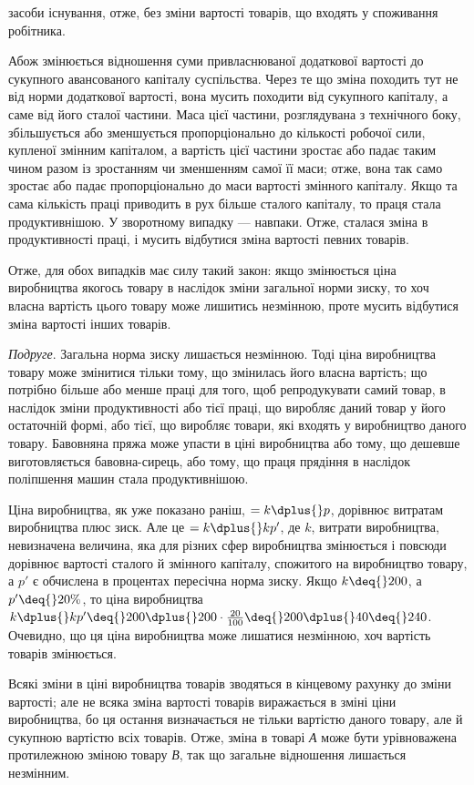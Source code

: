 \parcont{}  %
засоби існування, отже, без зміни вартості товарів, що входять у споживання робітника.

Абож змінюється відношення суми привласнюваної додаткової вартості до сукупного авансованого
капіталу суспільства. Через те що зміна походить тут не від норми додаткової вартості, вона мусить
походити від сукупного капіталу, а саме від його сталої частини. Маса цієї частини, розглядувана з
технічного боку, збільшується або зменшується пропорціонально до кількості робочої сили, купленої
змінним капіталом, а вартість цієї частини зростає або падає таким чином разом із зростанням чи
зменшенням самої її маси; отже, вона так само зростає або падає пропорціонально до маси вартості
змінного капіталу. Якщо та сама кількість праці приводить в рух більше сталого капіталу, то праця
стала продуктивнішою. У зворотному випадку — навпаки. Отже, сталася зміна в продуктивності праці, і
мусить відбутися зміна вартості певних товарів.

Отже, для обох випадків має силу такий закон: якщо змінюється ціна виробництва якогось товару в
наслідок зміни загальної норми зиску, то хоч власна вартість цього товару може лишитись незмінною,
проте мусить відбутися зміна вартості інших товарів.

\emph{Подруге}. Загальна норма зиску лишається незмінною. Тоді ціна виробництва товару може змінитися
тільки тому, що змінилась його власна вартість; що потрібно більше або менше праці для того, щоб
репродукувати самий товар, в наслідок зміни продуктивності або тієї праці, що виробляє даний товар у
його остаточній формі, або тієї, що виробляє товари, які входять у виробництво даного товару.
Бавовняна пряжа може упасти в ціні виробництва або тому, що дешевше виготовляється бавовна-сирець,
або тому, що праця прядіння в наслідок поліпшення машин стала продуктивнішою.

Ціна виробництва, як уже показано раніш, $= k \dplus{} p$, дорівнює витратам виробництва плюс зиск. Але це
$= k \dplus{} kp'$, де $k$, витрати виробництва, невизначена величина, яка для різних сфер виробництва змінюється
і повсюди дорівнює вартості сталого й змінного капіталу, спожитого на виробництво товару, а $p'$ є
обчислена в процентах пересічна норма зиску. Якщо $k \deq{} 200$, а $p' \deq{} 20\%$, то ціна виробництва $k \dplus{} kp' \deq{}
200 \dplus{} 200\cdot\frac{20}{100} \deq{} 200
\dplus{} 40 \deq{} 240$. Очевидно, що ця ціна виробництва може лишатися незмінною, хоч вартість товарів
змінюється.

Всякі зміни в ціні виробництва товарів зводяться в кінцевому рахунку до зміни вартості; але не всяка
зміна вартості товарів виражається в зміні ціни виробництва, бо ця остання визначається не тільки
вартістю даного товару, але й сукупною вартістю всіх товарів. Отже, зміна в товарі \emph{А} може бути
урівноважена протилежною зміною товару \emph{В}, так що загальне відношення лишається незмінним.
